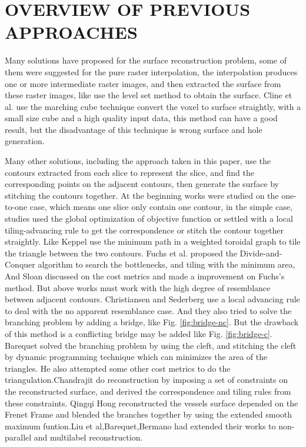 \documentclass[3p,times]{elsarticle}
\begin{document}
\section{OVERVIEW OF PREVIOUS APPROACHES}
\label{section2}
Many solutions have proposed for the surface reconstruction problem,
some of them were suggested for the pure raster interpolation, the
interpolation produces one or more intermediate raster images, and
then extracted the surface from these raster images, like use the
level set method to obtain the surface. Cline et
al.\cite{cline_two_1988,lorensen_marching_1987} use the marching cube
technique convert the voxel to surface straightly, with a small size
cube and a high quality input data, this method can have a good
result, but the disadvantage of this technique is wrong surface
and hole generation.\cite{jin_improved_2006}

Many other solutions, including the approach taken in this paper, use
the contours extracted from each slice to represent the slice, and
find the corresponding points on the adjacent contours, then generate the surface by stitching
the contours together. At the beginning works were studied on the
one-to-one case, which means one slice only contain one contour, in
the simple case, studies used the global optimization of objective
function or settled with a local tiling-advancing rule to get the
correspondence or stitch the contour together straightly. Like
Keppel\cite{keppel_approximating_1975} use the minimum path in a
weighted toroidal graph to tile the triangle between the two
contours. Fuchs et al.\cite{fuchs_optimal_1977} proposed the
Divide-and-Conquer algorithm to search the bottlenecks, and tiling
with the minimum area, And Sloan\cite{sloan_pessimal_1988} discussed
on the cost metrics and made a improvement on Fuchs's method. But
above works must work with the high degree of resemblance between
adjacent contours. Christiansen and
Sederberg\cite{christiansen_conversion_1978} use a local advancing
rule to deal with the no apparent resemblance case. And they also
tried to solve the branching problem by adding a bridge, like
Fig. \ref{fig:bridge-nc}. But the drawback of this method is a
conflicting bridge may be added like Fig. \ref{fig:bridge-c}. Barequet
solved the branching problem by using the cleft, and stitching the
cleft by dynamic programming technique which can minimizes the area of
the triangles\cite{barequet_piecewise-linear_1996}. He also attempted some other
cost metrics to do the
triangulation\cite{barequet_history_1996,barequet_multilevel_2000}.Chandrajit
do reconstruction by imposing a set of constraints on the
reconstructed surface, and derived the correspondence and tiling rules
from these constraints\cite{bajaj_arbitrary_1996}. Qingqi Hong
reconstructed the vessels surface depended on the Frenet Frame and
blended the branches together by using the extended smooth maximum
funtion\cite{hong_implicit_2012}.Liu et
al\cite{liu_surface_2008},Barequet\cite{barequet_reconstruction_2009},Bermano\cite{bermano_online_2011}
had extended their works to non-parallel and multilabel reconstruction.
\end{document}
